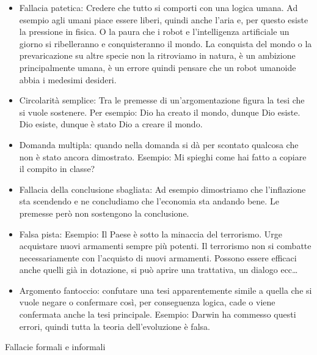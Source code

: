 \documentclass[12pt]{book} %
\begin{document}
\begin{itemize}
\item Fallacia patetica: Credere che tutto si comporti con una logica umana. Ad esempio agli umani piace essere liberi,
quindi anche l'aria e, per questo esiste la pressione in fisica. O la paura che i robot e
l'intelligenza artificiale un giorno si ribelleranno e conquisteranno il mondo. La conquista del
mondo o la prevaricazione su altre specie non la ritroviamo in natura, è un ambizione principalmente umana, è un errore
quindi pensare che un robot umanoide abbia i medesimi desideri.
\item Circolarità semplice: Tra le premesse di un'argomentazione figura la tesi che si vuole sostenere. Per esempio: Dio
ha creato il mondo, dunque Dio esiste. Dio esiste, dunque è stato Dio a creare il mondo.
\item Domanda multipla: quando nella domanda si dà per scontato qualcosa che non è stato ancora dimostrato. Esempio: Mi
spieghi come hai fatto a copiare il compito in classe?
\item Fallacia della conclusione sbagliata: Ad esempio dimostriamo che l'inflazione sta scendendo e
ne concludiamo che l'economia sta andando bene. Le premesse però non sostengono la conclusione.
\item Falsa pista: Esempio: Il Paese è sotto la minaccia del terrorismo. Urge acquistare nuovi armamenti sempre più
potenti. Il terrorismo non si combatte necessariamente con l'acquisto di nuovi armamenti. Possono essere efficaci anche
quelli già in dotazione, si può aprire una trattativa, un dialogo ecc…
\item Argomento fantoccio: confutare una tesi apparentemente simile a quella che si vuole negare o confermare così, per
conseguenza logica, cade o viene confermata anche la tesi principale. Esempio: Darwin ha commesso questi errori, quindi
tutta la teoria dell'evoluzione è falsa.
\end{itemize}

Fallacie formali e informali
\end{document}

